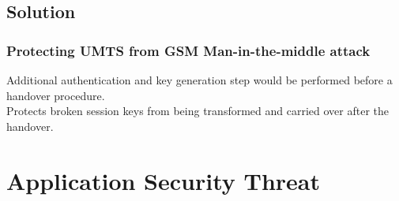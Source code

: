 \documentclass{beamer}
\begin{document}
\subsection{Solution}
\begin{frame}


\frametitle{Protecting UMTS from GSM Man-in-the-middle attack}
 Additional authentication and key generation step would be performed before a handover procedure.\\
 Protects broken session keys from being transformed and carried over after the handover.
\end{frame}
\section{Application Security Threat}

\end{document}
